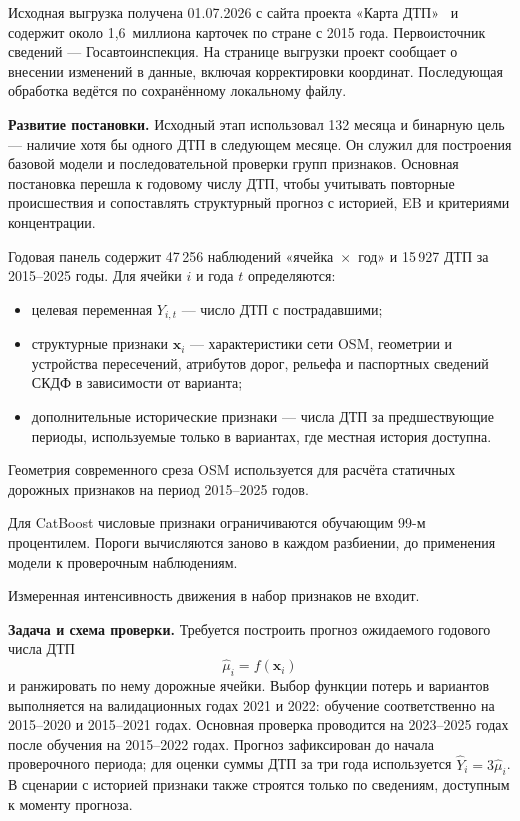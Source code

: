 \documentclass[coursework]{SCWorks}
\begin{document}
Исходная выгрузка получена 01.07.2026 с сайта проекта
«Карта ДТП»~\cite{dtpstat} и содержит около 1{,}6~миллиона карточек
по стране с 2015 года. Первоисточник сведений --- Госавтоинспекция.
На странице выгрузки проект сообщает о внесении изменений в данные,
включая корректировки координат. Последующая обработка ведётся
по сохранённому локальному файлу.

\textbf{Развитие постановки.} Исходный этап использовал 132 месяца
и бинарную цель --- наличие хотя бы одного ДТП в следующем месяце.
Он служил для построения базовой модели и последовательной проверки
групп признаков. Основная постановка перешла к годовому числу ДТП,
чтобы учитывать повторные происшествия и сопоставлять структурный
прогноз с историей, EB и критериями концентрации.

Годовая панель содержит 47\,256 наблюдений «ячейка~$\times$~год»
и 15\,927 ДТП за 2015--2025 годы. Для ячейки $i$ и года $t$
определяются:
\begin{itemize}
  \item целевая переменная $Y_{i,t}$ --- число ДТП с пострадавшими;
  \item структурные признаки $\mathbf{x}_i$ --- характеристики сети
        OSM, геометрии и устройства пересечений, атрибутов дорог,
        рельефа и паспортных сведений СКДФ в зависимости от варианта;
  \item дополнительные исторические признаки --- числа ДТП за
        предшествующие периоды, используемые только в вариантах,
        где местная история доступна.
\end{itemize}
Геометрия современного среза OSM используется для расчёта
статичных дорожных признаков на период 2015--2025 годов.

Для CatBoost числовые признаки ограничиваются обучающим
99-м процентилем. Пороги вычисляются заново в каждом разбиении,
до применения модели к проверочным наблюдениям.

Измеренная интенсивность движения в набор признаков не входит.

\textbf{Задача и схема проверки.} Требуется построить прогноз
ожидаемого годового числа ДТП
\begin{equation}
  \widehat\mu_i=f(\mathbf{x}_i)
\end{equation}
и ранжировать по нему дорожные ячейки. Выбор функции потерь и
вариантов выполняется на валидационных годах 2021 и 2022:
обучение соответственно на 2015--2020 и 2015--2021 годах.
Основная проверка проводится на 2023--2025 годах после обучения
на 2015--2022 годах. Прогноз зафиксирован до начала проверочного
периода; для оценки суммы ДТП за три года используется
$\widehat Y_i=3\widehat\mu_i$. В сценарии с историей признаки также
строятся только по сведениям, доступным к моменту прогноза.
\end{document}
